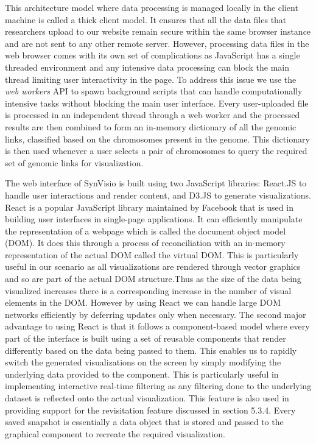 This architecture model where data processing is managed locally in the client machine is called a thick client model. It ensures that all the data files that researchers upload to our website remain secure within the same browser instance and are not sent to any other remote server. However, processing data files in the web browser comes with its own set of complications as JavaScript has a single threaded environment and any intensive data processing can block the main thread limiting user interactivity in the page. To address this issue we use the \textit{web workers} API to spawn background scripts that can handle computationally intensive tasks without blocking the main user interface\cite{webworkers}. Every user-uploaded file is processed in an independent thread through a web worker and the processed results are then combined to form an in-memory dictionary of all the genomic links, classified based on the chromosomes present in the genome. This dictionary is then used whenever a user selects a pair of chromosomes to query the required set of genomic links for visualization.

The web interface of SynVisio is built using two JavaScript libraries: React.JS\cite{react} to handle user interactions and render content, and D3.JS\cite{d3js} to generate visualizations.
React is a popular JavaScript library maintained by Facebook\cite{facebook} that is used in building user interfaces in single-page applications. It can efficiently manipulate the representation of a webpage which is called the document object model (DOM). It does this through a process of reconciliation with an in-memory representation of the actual DOM called the virtual DOM. This is particularly useful in our scenario as all visualizations are rendered through vector graphics and so are part of the actual DOM structure.Thus as the size of the data being visualized increases there is a corresponding increase in the number of visual elements in the DOM. However by using React we can handle large DOM networks efficiently by deferring updates only when necessary. The second major advantage to using React is that it follows a component-based model where every part of the interface is built using a set of reusable components that render differently based on the data being passed to them. This enables us to rapidly switch the generated visualizations on the screen by simply modifying the underlying data provided to the component. This is particularly useful in implementing interactive real-time filtering as any filtering done to the underlying dataset is reflected onto the actual visualization. This feature is also used in providing support for the revisitation feature discussed in section 5.3.4. Every saved snapshot is essentially a data object that is stored and passed to the graphical component to recreate the required visualization.

